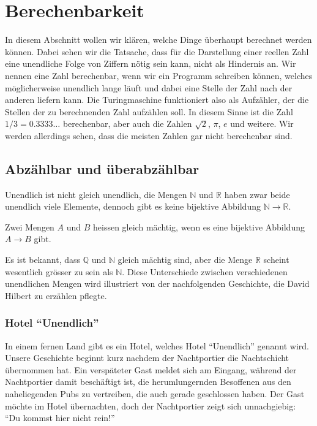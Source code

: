 %
%
%
\section{Berechenbarkeit}
In diesem Abschnitt wollen wir klären, welche Dinge überhaupt
berechnet werden können. Dabei sehen wir die Tatsache, dass für
die Darstellung einer reellen Zahl eine unendliche Folge von Ziffern
nötig sein kann, nicht als Hindernis an. Wir nennen eine Zahl
berechenbar, wenn wir ein Programm schreiben können, welches
möglicherweise unendlich lange läuft und dabei eine Stelle der
Zahl nach der anderen liefern kann. Die Turingmaschine
funktioniert also als Aufzähler, der die Stellen der zu berechnenden
Zahl aufzählen soll.  In diesem Sinne ist die
Zahl $1/3=0.3333\dots$ berechenbar, aber auch die Zahlen $\sqrt{2}$, $\pi$,
$e$ und weitere. Wir werden allerdings sehen, dass die meisten
Zahlen gar nicht berechenbar sind.

\subsection{Abzählbar und überabzählbar}
Unendlich ist nicht gleich unendlich, die Mengen $\mathbb N$ und
$\mathbb R$ haben zwar beide unendlich viele Elemente, dennoch
gibt es keine bijektive Abbildung $\mathbb N\to \mathbb R$.

\begin{definition}
%
Zwei Mengen $A$ und $B$ heissen gleich mächtig, wenn es eine bijektive
Abbildung $A\to B$ gibt.
\end{definition}

Es ist bekannt, dass $\mathbb Q$ und $\mathbb N$ gleich mächtig sind,
aber die Menge $\mathbb R$ scheint wesentlich grösser
zu sein als $\mathbb N$.
Diese Unterschiede zwischen verschiedenen
unendlichen Mengen wird illustriert von der nachfolgenden Geschichte,
die David Hilbert zu erzählen pflegte.

\subsubsection{Hotel ``Unendlich''}
%
%
In einem fernen Land gibt es ein Hotel, welches Hotel ``Unendlich''
genannt wird. Unsere Geschichte beginnt kurz nachdem der Nachtportier
die Nachtschicht übernommen hat. Ein verspäteter Gast meldet sich
am Eingang, während der Nachtportier damit beschäftigt ist,
die herumlungernden Besoffenen
aus den naheliegenden Pubs zu vertreiben, die auch gerade geschlossen haben.
Der Gast möchte im Hotel übernachten, doch der Nachtportier zeigt sich
unnachgiebig: ``Du kommst hier nicht rein!''

